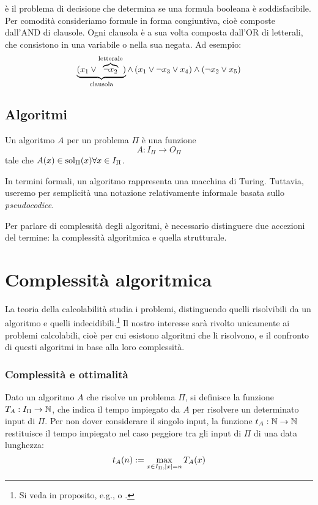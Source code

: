 \begin{examp}
	\Sat è il problema di decisione che determina se una formula booleana è soddisfacibile. Per comodità consideriamo formule in forma congiuntiva, cioè composte dall'AND di clausole. Ogni clausola è a sua volta composta dall'OR di letterali, che consistono in una variabile o nella sua negata. Ad esempio:
	\begin{equation*}
		\underbrace{(x_1\lor\overbrace{\lnot x_2}^{\text{letterale}})}_{\text{clausola}}\land\mkern 3mu (x_1\lor\lnot x_3\lor x_4)\land(\lnot x_2\lor x_5)
	\end{equation*}
\end{examp}



\subsection{Algoritmi}
Un algoritmo $A$ per un problema $\Pi$ è una funzione
\begin{equation*}
	A: I_{\Pi} \to O_{\Pi}
\end{equation*}
tale che $A(x)\in\mathrm{sol}_{\Pi}(x)\forall x\in I_\Pi$.

In termini formali, un algoritmo rappresenta una macchina di Turing.
Tuttavia, useremo per semplicità una notazione relativamente informale basata sullo \emph{pseudocodice}.

Per parlare di complessità degli algoritmi, è necessario distinguere due accezioni del termine: la complessità algoritmica e quella strutturale.



\section{Complessità algoritmica}
La teoria della calcolabilità studia i problemi, distinguendo quelli risolvibili da un algoritmo e quelli indecidibili.\footnote{Si veda in proposito, e.g., \cite{Hopcroft:79:introLFA} o \cite{Kfoury:82:programcomput}.} Il nostro interesse sarà rivolto unicamente ai problemi calcolabili, cioè per cui esistono algoritmi che li risolvono, e il confronto di questi algoritmi in base alla loro complessità.

\subsubsection{Complessità e ottimalità}
Dato un algoritmo $A$ che risolve un problema $\Pi$, si definisce la funzione $T_A:I_\Pi\to\mathbb N$, che indica il tempo impiegato da $A$ per risolvere un determinato input di $\Pi$. Per non dover considerare il singolo input, la funzione $t_A:\mathbb N\to\mathbb N$ restituisce il tempo impiegato nel caso peggiore tra gli input di $\Pi$ di una data lunghezza:
\begin{equation*}
	t_A(n):=\max_{x\in I_\Pi,|x|=n} T_A(x)
\end{equation*}

